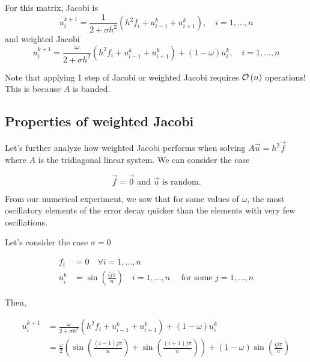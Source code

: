 For this matrix, Jacobi is 
\begin{equation*}
  u_i^{k+1} = \frac{1}{2+\sigma h^2}
  \left( h^2 f_i + u_{i-1}^k  + u_{i+1}^k\right), \quad i=1, \ldots, n
\end{equation*}
and weighted Jacobi
\begin{equation*}
  u_i^{k+1} = \frac{\omega}{2+\sigma h^2}
  \left( h^2 f_i + u_{i-1}^k  + u_{i+1}^k\right)
  +(1-\omega)u_i^k, \quad i=1, \ldots, n
\end{equation*}

Note that applying 1 step of Jacobi or weighted Jacobi requires $\mathcal{O}\left(n\right)$
operations! This is because $A$ is banded. 


\subsection{Properties of weighted Jacobi}

Let's further analyze how weighted Jacobi performs when solving
$A\vec{u}=h^2\vec{f}$ where $A$ is the tridiagonal linear system. We can
consider the case

\begin{equation*}
\vec{f}= \vec{0} \text{ and } \vec{u} \text{ is random.}
\end{equation*}

From our numerical experiment, we saw that for some values of $\omega$, the most
oscillatory elements of the error decay quicker than the elements with very few
oscillations.

Let's consider the case $\sigma=0$

\begin{align*}
  f_i &= 0 \quad \forall i=1, \ldots, n\\
  u_i^k &= \sin \left( \frac{ij\pi}{n} \right) \quad i=1, \ldots, n \quad \text{ for some } j = 1, \ldots, n
\end{align*}

Then,

\begin{align*}
  u_i^{k+1} &= \frac{\omega}{2+\sigma h^2}
  \left( h^2 f_i + u_{i-1}^k  + u_{i+1}^k\right)
  +(1-\omega)u_i^k\\
  &= \frac{\omega}{2}
  \left( \sin \left( \frac{(i-1)j\pi}{n} \right)  + \sin \left( \frac{(i+1)j\pi}{n} \right)\right)
  +(1-\omega)\sin \left( \frac{ij\pi}{n} \right)\\
\end{align*}

